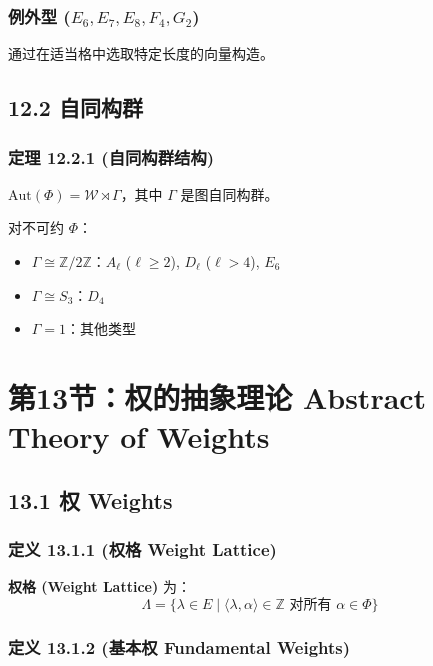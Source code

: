 \subsubsection{例外型 (\texorpdfstring{$E_6, E_7, E_8, F_4, G_2$}{E_6, E_7, E_8, F_4, G_2})}

通过在适当格中选取特定长度的向量构造。

\subsection{12.2 自同构群}

\subsubsection{定理 12.2.1 (自同构群结构)}

$\text{Aut}(\Phi) = \mathcal{W} \rtimes \Gamma$，其中 $\Gamma$ 是图自同构群。

对不可约 $\Phi$：

\begin{itemize}
	\item $\Gamma \cong \mathbb{Z}/2\mathbb{Z}$：$A_\ell$ ($\ell \geq 2$), $D_\ell$ ($\ell > 4$), $E_6$
	\item $\Gamma \cong S_3$：$D_4$
	\item $\Gamma = 1$：其他类型
\end{itemize}


\section{第13节：权的抽象理论 Abstract Theory of Weights}

\subsection{13.1 权 Weights}

\subsubsection{定义 13.1.1 (权格 Weight Lattice)}

\textbf{权格 (Weight Lattice)} 为：
\[
\Lambda = \{\lambda \in E \mid \langle\lambda, \alpha\rangle \in \mathbb{Z} \text{ 对所有 } \alpha \in \Phi\}
\]

\subsubsection{定义 13.1.2 (基本权 Fundamental Weights)}


